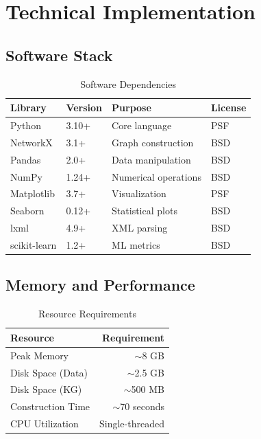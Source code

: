 \documentclass[11pt,a4paper]{article}
\begin{document}
\newpage
\section{Technical Implementation}

\subsection{Software Stack}

\begin{table}[h]
\centering
\caption{Software Dependencies}
\begin{tabular}{@{}llll@{}}
\toprule
\textbf{Library} & \textbf{Version} & \textbf{Purpose} & \textbf{License} \\
\midrule
Python & 3.10+ & Core language & PSF \\
NetworkX & 3.1+ & Graph construction & BSD \\
Pandas & 2.0+ & Data manipulation & BSD \\
NumPy & 1.24+ & Numerical operations & BSD \\
Matplotlib & 3.7+ & Visualization & PSF \\
Seaborn & 0.12+ & Statistical plots & BSD \\
lxml & 4.9+ & XML parsing & BSD \\
scikit-learn & 1.2+ & ML metrics & BSD \\
\bottomrule
\end{tabular}
\end{table}

\subsection{Memory and Performance}

\begin{table}[h]
\centering
\caption{Resource Requirements}
\begin{tabular}{@{}lr@{}}
\toprule
\textbf{Resource} & \textbf{Requirement} \\
\midrule
Peak Memory & $\sim$8 GB \\
Disk Space (Data) & $\sim$2.5 GB \\
Disk Space (KG) & $\sim$500 MB \\
Construction Time & $\sim$70 seconds \\
CPU Utilization & Single-threaded \\
\bottomrule
\end{tabular}
\end{table}
\end{document}
